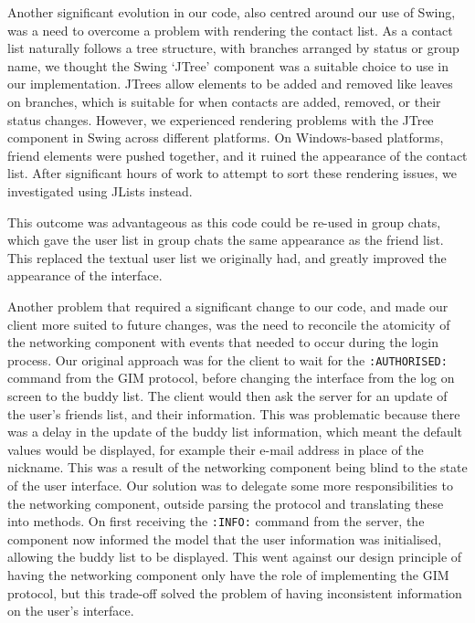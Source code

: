 Another significant evolution in our code, also centred around our use of Swing, was a need to overcome a problem with rendering the contact list. As a contact list naturally follows a tree structure, with branches arranged by status or group name, we thought the Swing `JTree' component was a suitable choice to use in our implementation. JTrees allow elements to be added and removed like leaves on branches, which is suitable for when contacts are added, removed, or their status changes. However, we experienced rendering problems with the JTree component in Swing across different platforms. On Windows-based platforms, friend elements were pushed together, and it ruined the appearance of the contact list. After significant hours of work to attempt to sort these rendering issues, we investigated using JLists instead. %

This outcome was advantageous as this code could be re-used in group chats, which gave the user list in group chats the same appearance as the friend list. This replaced the textual user list we originally had, and greatly improved the appearance of the interface.  

Another problem that required a significant change to our code, and made our client more suited to future changes, was the need to reconcile the atomicity of the networking component with events that needed to occur during the login process. Our original approach was for the client to wait for the \texttt{:AUTHORISED:} command from the GIM protocol, before changing the interface from the log on screen to the buddy list. The client would then ask the server for an update of the user's friends list, and their information. This was problematic because there was a delay in the update of the buddy list information, which meant the default values would be displayed, for example their e-mail address in place of the nickname. This was a result of the networking component being blind to the state of the user interface. Our solution was to delegate some more responsibilities to the networking  component, outside parsing the protocol and translating these into methods. On first receiving the \texttt{:INFO:} command from the server, the component now informed the model that the user information was initialised, allowing the buddy list to be displayed. This went against our design principle of having the networking component only have the role of implementing the GIM protocol, but this trade-off solved the problem of having inconsistent information on the user's interface. 
